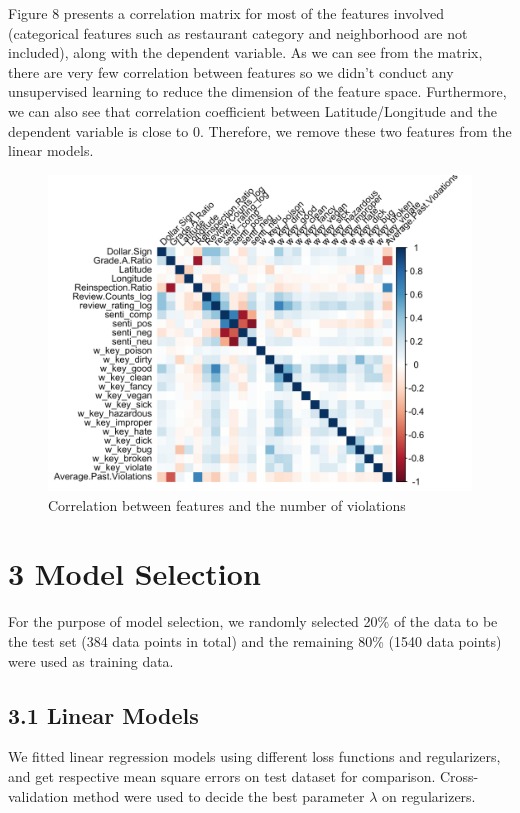 \documentclass[letterpaper, 11 pt, conference]{ieeeconf}
\begin{document}
Figure 8 presents a correlation matrix for most of the features involved (categorical features such as restaurant category and neighborhood are not included), along with the dependent variable. As we can see from the matrix, there are very few correlation between features so we didn't conduct any unsupervised learning to reduce the dimension of the feature space. 
Furthermore, we can also see that correlation coefficient between  Latitude/Longitude and the dependent variable is close to 0. Therefore, we remove these two features from the linear models. 
\begin{figure}[h]
	\centering
    \includegraphics[scale = 0.4]{cor}
    \caption{Correlation between features and the number of violations}
\end{figure}



\section*{3 Model Selection}

For the purpose of model selection, we randomly selected 20\% of the data to be the test set (384 data points in total) and the remaining 80\% (1540 data points) were used as training data. 

\subsection*{3.1 Linear Models}

We fitted linear regression models using different loss functions and regularizers, and get respective mean square errors on test dataset for comparison. Cross-validation method were used to decide the best parameter $\lambda$ on regularizers. 
\end{document}
